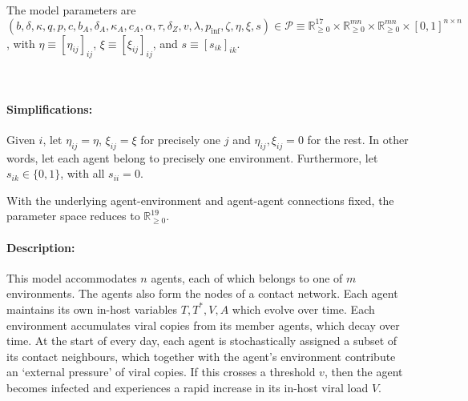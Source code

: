 \documentclass[11pt]{article}
\begin{document}
    The model parameters are $(b, \delta, \kappa, q, p, c, b_A, \delta_A,
    \kappa_A, c_A, \alpha, \tau, \delta_Z, v, \lambda, p_\text{inf}, \zeta,
    \eta, \xi, s) \in \mathcal{P} \equiv \mathbb{R}_{\geq 0}^{17} \times
    \mathbb{R}_{\geq 0}^{mn} \times \mathbb{R}_{\geq 0}^{mn} \times [0,
    1]^{n\times n}$, with $\eta \equiv [\eta_{ij}]_{ij}$, $\xi \equiv
    [\xi_{ij}]_{ij}$, and $s \equiv [s_{ik}]_{ik}$.

    ~

    \paragraph{Simplifications:} Given $i$, let $\eta_{ij} = \eta$, $\xi_{ij}
    = \xi$ for precisely one $j$ and $\eta_{ij}, \xi_{ij} = 0$ for the rest.
    In other words, let each agent belong to precisely one environment.
    Furthermore, let $s_{ik} \in \{0, 1\}$, with all $s_{ii} = 0$.

    With the underlying agent-environment and agent-agent connections fixed,
    the parameter space reduces to $\mathbb{R}_{\geq 0}^{19}$.

    \paragraph{Description:} This model accommodates $n$ agents, each of which
    belongs to one of $m$ environments. The agents also form the nodes of a
    contact network. Each agent maintains its own in-host variables $T, T^*,
    V, A$ which evolve over time. Each environment accumulates viral copies
    from its member agents, which decay over time. At the start of every day,
    each agent is stochastically assigned a subset of its contact neighbours,
    which together with the agent's environment contribute an `external
    pressure' of viral copies. If this crosses a threshold $v$, then the agent
    becomes infected and experiences a rapid increase in its in-host viral
    load $V$.
\end{document}
